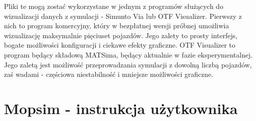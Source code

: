 Pliki te mogą zostać wykorzystane w jednym z programów służących do wizualizacji danych z symulacji - Simunto Via lub OTF Visualizer. Pierwszy z nich to program komercyjny, który w bezpłatnej wersji próbnej umożliwia wizualizację maksymalnie pięciuset pojazdów. Jego zalety to prosty interfejs, bogate możliwości konfiguracji i ciekawe efekty graficzne. OTF Visualizer to program będący składową MATSima, będący aktualnie w fazie eksperymentalnej. Jego zaletą jest możliwość przeprowadzania symulacji z dowolną liczbą pojazdów, zaś wadami - częściowa niestabilność i mniejsze możliwości graficzne.

\section{Mopsim - instrukcja użytkownika}
